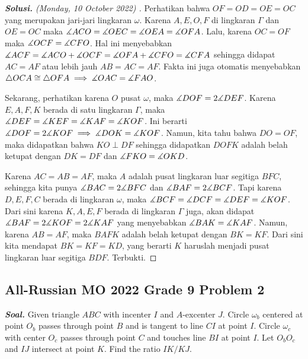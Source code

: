 \documentclass[letterpaper, 13pt]{scrartcl}
\begin{document}
\begin{proof}[\textbf{Solusi. } (Monday, 10 October 2022) ]
Perhatikan bahwa $OF=OD=OE=OC$ yang merupakan jari-jari lingkaran $\omega$. Karena $A,E,O,F$ di lingkaran $\Gamma$ dan $OE=OC$ maka $\measuredangle ACO = \measuredangle OEC = \measuredangle OEA = \measuredangle OFA$. Lalu, karena $OC=OF$ maka $\measuredangle OCF = \measuredangle CFO$. Hal ini menyebabkan $\measuredangle ACF = \measuredangle ACO + \measuredangle OCF = \measuredangle OFA + \measuredangle CFO = \measuredangle CFA$ sehingga didapat $AC=AF$ atau lebih jauh $AB=AC=AF$. Fakta ini juga otomatis menyebabkan $\triangle OCA \cong \triangle OFA \implies \measuredangle OAC = \measuredangle FAO$.

Sekarang, perhatikan karena $O$ pusat $\omega$, maka $\measuredangle DOF = 2\measuredangle DEF$. Karena $E,A,F,K$ berada di satu lingkaran $\Gamma$, maka $\measuredangle DEF = \measuredangle KEF = \measuredangle KAF = \measuredangle KOF$. Ini berarti $\measuredangle DOF = 2\measuredangle KOF \implies \measuredangle DOK = \measuredangle KOF$. Namun, kita tahu bahwa $DO=OF$, maka didapatkan bahwa $KO \perp DF$ sehingga didapatkan $DOFK$ adalah belah ketupat dengan $DK=DF$ dan $\measuredangle FKO = \measuredangle OKD$.

Karena $AC=AB=AF$, maka $A$ adalah pusat lingkaran luar segitiga $BFC$, sehingga kita punya $\measuredangle BAC = 2\measuredangle BFC$ dan $\measuredangle BAF = 2\measuredangle BCF$. Tapi karena $D,E,F,C$ berada di lingkaran $\omega$, maka $\measuredangle BCF = \measuredangle DCF = \measuredangle DEF = \measuredangle KOF$. Dari sini karena $K,A,E,F$ berada di lingkaran $\Gamma$ juga, akan didapat $\measuredangle BAF = 2\measuredangle KOF = 2\measuredangle KAF$ yang menyebabkan $\measuredangle BAK = \measuredangle KAF$. Namun, karena $AB=AF$, maka $BAFK$ adalah belah ketupat dengan $BK=KF$. Dari sini kita mendapat $BK=KF=KD$, yang berarti $K$ haruslah menjadi pusat lingkaran luar segitiga $BDF$. Terbukti.

\end{proof}

\subsection{All-Russian MO 2022 Grade 9 Problem 2}

\textbf{\textit{Soal. }}Given triangle $ABC$ with incenter $I$ and $A$-excenter $J$. Circle $\omega_b$ centered at point $O_b$ passes through point $B$ and is tangent to line $CI$ at point $I$. Circle $\omega_c$ with center $O_c$ passes through point $C$ and touches line $BI$ at point $I$. Let $O_bO_c$ and $IJ$ intersect at point $K$. Find the ratio $IK/KJ$.
\end{document}
